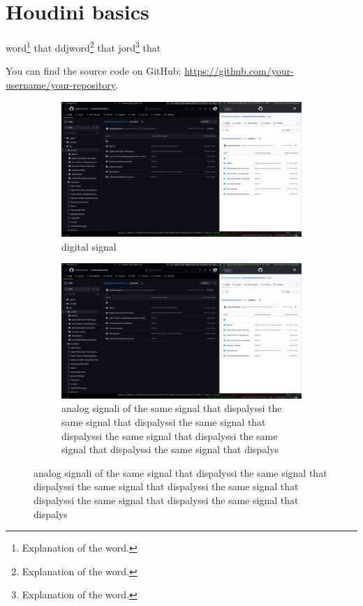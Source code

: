 

\section{Houdini basics}


word\footnote{Explanation of the word.} that
ddjword\footnote{Explanation of the word.} that
jord\footnote{Explanation of the word.} that

You can find the source code on GitHub: \url{https://github.com/your-username/your-repository}.


\begin{figure}[H] 
    \centering
    \begin{subfigure}[b]{0.49\textwidth}
        \centering
        \includegraphics[width=1\textwidth]{sections/assignment_1/1.png}
        \caption{digital signal}
    \end{subfigure}
    \hfill
    \begin{subfigure}[b]{0.49\textwidth}
        \centering
        \includegraphics[width=1\textwidth]{sections/assignment_1/1.png}
        \caption{analog signali of the same signal that dispalyssi the same signal that dispalyssi the same signal that dispalyssi the same signal that dispalyssi the same signal that dispalyssi the same signal that dispalys} 
    \end{subfigure}
\end{figure}





